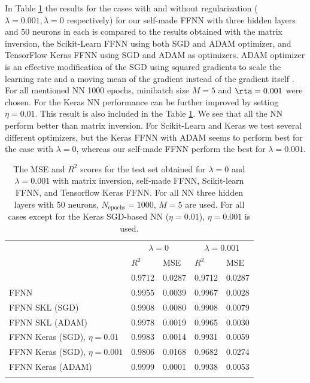 \documentclass{emulateapj}
\begin{document}
In Table \ref{tab:Ols vs ridge vs FFNN and NN} the results for the cases with and without regularization ($\lambda=0.001, \lambda=0$ respectively) for our self-made FFNN with three hidden layers and 50 neurons in each is compared to the results obtained with the matrix inversion, the Scikit-Learn FFNN using both SGD and ADAM optimizer, and TensorFlow Keras FFNN using SGD and ADAM as optimizers. ADAM optimizer is an effective modification of the SGD using squared gradients to scale the learning rate and a moving mean of the gradient instead of the gradient itself \cite{Morten}. For all mentioned NN 1000 epochs, minibatch size $M=5$ and $\rta=0.001$ were chosen. For the Keras NN performance can be further improved by setting $\eta=0.01$. This result is also included in the Table \ref{tab:Ols vs ridge vs FFNN and NN}. We see that all the NN perform better than matrix inversion. For Scikit-Learn and Keras we test several different optimizers, but the Keras FFNN with ADAM seems to perform best for the case with $\lambda=0$, whereas our self-made FFNN perform the best for $\lambda=0.001$.

\begin{table}[!htb]
\begin{center}
\caption{\scriptsize The MSE and $R^2$ scores for the test set obtained for  $\lambda=0$ and $\lambda=0.001$ with matrix inversion, self-made FFNN, Scikit-learn FFNN, and Tensorflow Keras FFNN. For all NN three hidden layers with 50 neurons, $N_{\mathrm{epochs}}=1000$, $M=5$ are used. For all cases except for the Keras SGD-based NN ($\eta=0.01$), $\eta=0.001$ is used.}
\label{tab:Ols vs ridge vs FFNN and NN}  
\begin{tabular}{lllll}
\cline{2-5}\noalign{\smallskip}\cline{2-5}\noalign{\smallskip}
& \multicolumn{2}{c}{$\lambda=0$} & \multicolumn{2}{c}{$\lambda=0.001$} \\ \cline{2-5}\noalign{\smallskip} 
& $R^2$ & MSE & $R^2$ & MSE \\ \hline\noalign{\smallskip}
\multicolumn{1}{l|}{Mat.inv.} & 0.9712 & 0.0287 & 0.9712 & 0.0287\\
\multicolumn{1}{l|}{FFNN} & 0.9955 & 0.0039 & 0.9967 & 0.0028\\
\multicolumn{1}{l|}{FFNN SKL (SGD)} & 0.9908 & 0.0080 & 0.9908 & 0.0079\\
\multicolumn{1}{l|}{FFNN SKL (ADAM)} & 0.9978 & 0.0019 & 0.9965 & 0.0030\\
\multicolumn{1}{l|}{FFNN Keras (SGD), $\eta=0.01$} & 0.9983 & 0.0014 & 0.9931 & 0.0059\\
\multicolumn{1}{l|}{FFNN Keras (SGD), $\eta=0.001$} & 0.9806 & 0.0168 & 0.9682 & 0.0274\\
\multicolumn{1}{l|}{FFNN Keras (ADAM)} & 0.9999 & 0.0001 & 0.9938 & 0.0053\\
 \noalign{\smallskip}\hline
\end{tabular}
\end{center}
\end{table}
\end{document}
